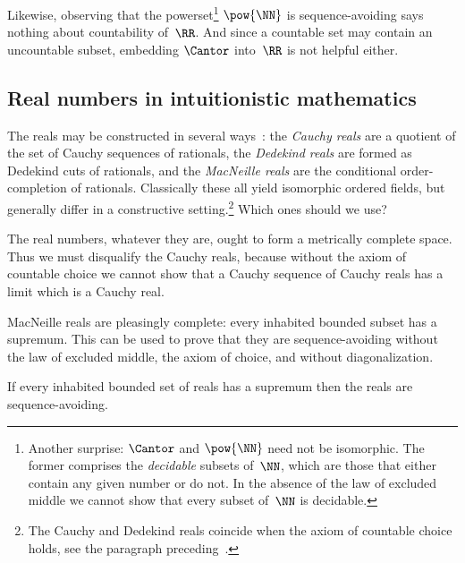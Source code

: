 Likewise, observing that the powerset\footnote{Another surprise: $\Cantor$ and $\pow{\NN}$ need not be isomorphic. The former comprises the \emph{decidable} subsets of~$\NN$, which are those that either contain any given number or do not. In the absence of the law of excluded middle we cannot show that every subset of~$\NN$ is decidable.} $\pow{\NN}$ is sequence-avoiding says nothing about countability of~$\RR$.
%
And since a countable set may contain an uncountable subset, embedding $\Cantor$ into~$\RR$ is not helpful either.

\subsection{Real numbers in intuitionistic mathematics}
\label{sec:real-numb-intu}

The reals may be constructed in several ways~\cite[Sect.~D4.7]{johnstone02:_sketc_eleph}: the \emph{Cauchy reals} are a quotient of the set of Cauchy sequences of rationals, the \emph{Dedekind reals} are formed as Dedekind cuts of rationals, and the \emph{MacNeille reals} are the conditional order-completion of rationals.
%
Classically these all yield isomorphic ordered fields, but generally differ in a constructive setting.\footnote{The Cauchy and Dedekind reals coincide when the axiom of countable choice holds, see the paragraph preceding~\cite[Thm.~D4.7.12]{johnstone02:_sketc_eleph}.} Which ones should we use?

The real numbers, whatever they are, ought to form a metrically complete space. Thus we must disqualify the Cauchy reals, because without the axiom of countable choice we cannot show that a Cauchy sequence of Cauchy reals has a limit which is a Cauchy real.

MacNeille reals are pleasingly complete: every inhabited bounded subset has a supremum.
This can be used to prove that they are sequence-avoiding without the law of excluded middle, the axiom of choice, and without diagonalization.

\begin{theoremC}
  \label{thm:fixed-point-R-uncountable}
  If every inhabited bounded set of reals has a supremum then the reals are sequence-avoiding.
\end{theoremC}

